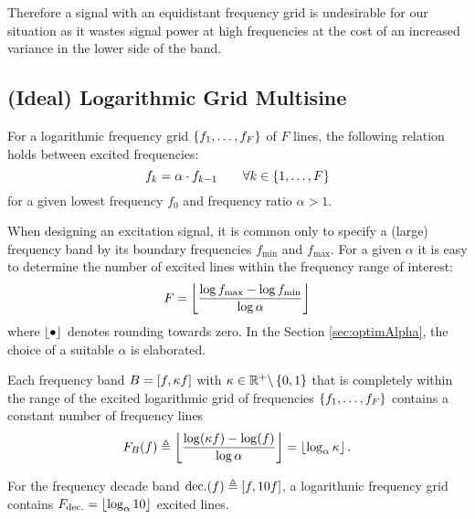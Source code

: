   Therefore a signal with an equidistant frequency grid is undesirable for
  our situation as it wastes signal power at high frequencies at the cost of an increased variance in the lower side of the band.
  
\subsection{(Ideal) Logarithmic Grid Multisine}
  For a logarithmic frequency grid $\left\{f_1, \ldots, f_F\right\}$ of $F$ lines,
  the following relation holds between excited frequencies:
  \begin{equation}
    f_k = \alpha \cdot f_{k-1}
    \qquad \forall k \in \left\{1,\ldots,F\right\}
  \label{eq:logGrid}
  \end{equation}
  for a given lowest frequency $f_0$ and frequency ratio $\alpha > 1$.

  When designing an excitation signal, it is common only to specify a (large) frequency band
  by its boundary frequencies $f_{\min}$ and $f_{\max}$.
  For a given $\alpha$ it is easy to determine the number of excited lines
  within the frequency range of interest:
    \begin{equation}
      F = \left\lfloor 
                  \frac{\log{f_{\max}} - \log{f_{\min}}}
                       {\log{\alpha}}
                 \right\rfloor
    \label{eq:logms:F}
    \end{equation}
  where $\left\lfloor \bullet \right\rfloor$ denotes rounding towards zero.
  In the Section \ref{sec:optimAlpha}, the choice of a suitable $\alpha$ is elaborated.


  \begin{property}
   Each frequency band $B = \left[ f, \kappa f \right]$ with $\kappa \in \mathbb{R}^{+} \backslash \left\{0,1\right\}$ that is completely within the range of the excited logarithmic grid of frequencies $\left\{f_1, \ldots, f_F\right\}$ contains a constant number of frequency lines
   \begin{equation}
     F_{B}(f) \triangleq
     \left\lfloor \frac{\log (\kappa f) - \log( f )}{\log \alpha} \right\rfloor
         = \left\lfloor \log_{\alpha} \kappa \right\rfloor
         \text{.}
   \end{equation}
   \end{property}
  \begin{example}
    For the frequency decade band $\mathrm{dec.}(f) \triangleq \left[ f, 10 f \right]$, a logarithmic frequency grid contains $F_{\mathrm{dec.}} = \left\lfloor \log_{\alpha} 10 \right\rfloor$ excited lines.
  \end{example}

